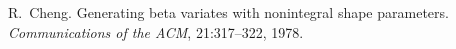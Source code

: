 
\begin{DoxyDescription}
\item[\label{_CITEREF_Cheng1978}%
\mbox{[}1\mbox{]}]R.~Cheng. Generating beta variates with nonintegral shape parameters. {\itshape Communications of the A\+CM}, 21\+:317--322, 1978.


\end{DoxyDescription}